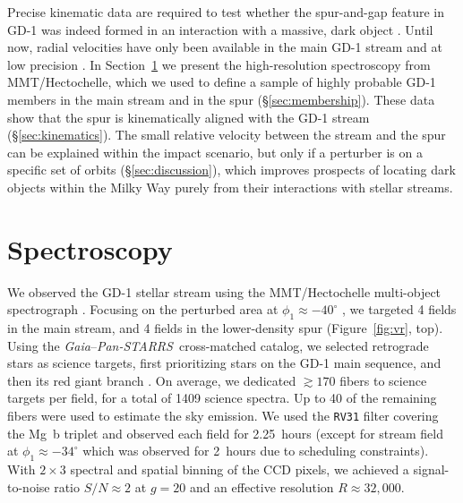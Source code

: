 \documentclass[twocolumn]{aastex63}
\newcommand{\gaia}{\textsl{Gaia}}
\newcommand{\pans}{\textsl{Pan-STARRS}}
\begin{document}
Precise kinematic data are required to test whether the spur-and-gap feature in GD-1 was indeed formed in an interaction with a massive, dark object \citep{bonaca2019a}.
Until now, radial velocities have only been available in the main GD-1 stream and at low precision \citep{koposov2010,huang2019}.
In Section~\ref{sec:spec} we present the high-resolution spectroscopy from MMT/Hectochelle, which we used to define a sample of highly probable GD-1 members in the main stream and in the spur (\S\ref{sec:membership}).
These data show that the spur is kinematically aligned with the GD-1 stream (\S\ref{sec:kinematics}).
The small relative velocity between the stream and the spur can be explained within the impact scenario, but only if a perturber is on a specific set of orbits (\S\ref{sec:discussion}), which improves prospects of locating dark objects within the Milky Way purely from their interactions with stellar streams.


\section{Spectroscopy}
\label{sec:spec}

We observed the GD-1 stellar stream using the MMT/Hectochelle multi-object spectrograph \citep{szentgyorgyi2011}.
Focusing on the perturbed area at $\phi_1\approx-40^\circ$ \citep[$\phi_{1,2}$ are coordinates oriented along and perpendicular to GD-1, respectively;][]{koposov2010}, we targeted 4 fields in the main stream, and 4 fields in the lower-density spur (Figure~\ref{fig:vr}, top).
Using the \gaia--\pans\ cross-matched catalog, we selected retrograde stars as science targets, first prioritizing stars on the GD-1 main sequence, and then its red giant branch \citep[see][]{pwb}.
On average, we dedicated $\gtrsim170$ fibers to science targets per field, for a total of 1409 science spectra.
Up to 40 of the remaining fibers were used to estimate the sky emission.
We used the \texttt{RV31} filter covering the Mg~b triplet and observed each field for 2.25~hours (except for stream field at $\phi_1\approx-34^\circ$ which was observed for 2~hours due to scheduling constraints).
With $2\times3$ spectral and spatial binning of the CCD pixels, we achieved a signal-to-noise ratio $S/N\approx2$ at $g=20$ and an effective resolution $R\approx32,000$.
\end{document}
